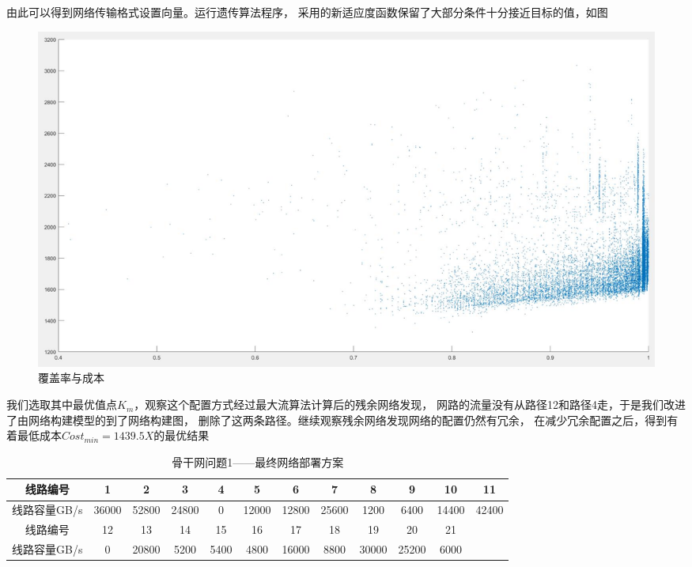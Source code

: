 \documentclass[UTF8,12pt]{ctexart}
\begin{document}
由此可以得到网络传输格式设置向量。运行遗传算法程序，
采用的新适应度函数保留了大部分条件十分接近目标的值，如图
\begin{figure}[H]
    \centering
    \includegraphics[scale=0.8]{cos.jpg}
    \caption{覆盖率与成本}
\end{figure}
我们选取其中最优值点$K_m$，观察这个配置方式经过最大流算法计算后的残余网络发现，
网路的流量没有从路径12和路径4走，于是我们改进了由网络构建模型的到了网络构建图，
删除了这两条路径。继续观察残余网络发现网络的配置仍然有冗余，
在减少冗余配置之后，得到有着最低成本$Cost_{min}=1439.5X$的最优结果
\begin{table}[htbp]
    \centering
    \caption{骨干网问题1——最终网络部署方案}
    \begin{scriptsize}

        \begin{tabular}{cccccccccccc}
            \toprule
            线路编号     & 1     & 2     & 3     & 4    & 5     & 6     & 7     & 8     & 9     & 10    & 11    \\
            \midrule
            线路容量GB/s & 36000 & 52800 & 24800 & 0    & 12000 & 12800 & 25600 & 1200  & 6400  & 14400 & 42400 \\
            \midrule
            线路编号     & 12    & 13    & 14    & 15   & 16    & 17    & 18    & 19    & 20    & 21    &       \\
            \midrule
            线路容量GB/s & 0     & 20800 & 5200  & 5400 & 4800  & 16000 & 8800  & 30000 & 25200 & 6000  &       \\
            \bottomrule
        \end{tabular}
    \end{scriptsize}
\end{table}%
\end{document}
